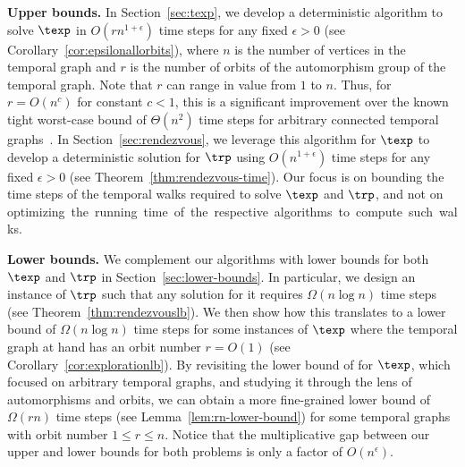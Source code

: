 \begin{sloppypar}
\textbf{Upper bounds.} 
In Section~\ref{sec:texp}, we develop a deterministic algorithm to solve $\texp$
in $O(r n^{1+\epsilon})$ time steps for any fixed $\epsilon >0$ (see
Corollary~\ref{cor:epsilonallorbits}), where $n$ is the number of vertices in
the temporal graph and $r$ is the number of orbits of the automorphism group of
the temporal graph. Note that $r$ can range in value from $1$ to $n$. Thus, for
$r=O(n^c)$ for constant $c<1$, this is a significant improvement over the known
tight worst-case bound of $\Theta(n^2)$ time steps for
arbitrary connected temporal graphs~\cite{ErlebachHK21}. %
In Section~\ref{sec:rendezvous}, {we leverage this algorithm for $\texp$ to
develop a deterministic solution for $\trp$ using} $O(n^{1+\epsilon})$ time
steps for any fixed $\epsilon > 0$ (see Theorem~\ref{thm:rendezvous-time}). 
Our focus is on bounding the time steps of the temporal walks required to
solve $\texp$ and $\trp$, and not on \mbox{optimizing the running time of the
respective algorithms to compute such walks.}
\end{sloppypar}

\textbf{Lower bounds.} 
We complement our algorithms with lower bounds for both $\texp$ and $\trp$ in
Section~\ref{sec:lower-bounds}. In particular, we design an instance of $\trp$
such that any solution for it requires $\Omega(n \log n)$ time steps (see
Theorem~\ref{thm:rendezvouslb}). We then show how this translates to a lower
bound of $\Omega(n \log n)$ time steps for {some instances of $\texp$ where
the temporal graph at hand has an orbit number $r=O(1)$ (see
Corollary~\ref{cor:explorationlb})}. By revisiting the lower bound of
\cite{ErlebachHK21} for $\texp$, which focused on arbitrary temporal graphs, and
studying it through the lens of automorphisms and orbits, we can obtain a more
fine-grained lower bound of $\Omega(rn)$ time steps (see
Lemma~\ref{lem:rn-lower-bound}) for {some temporal graphs with orbit number
$1\le r \le n$.} Notice that the {multiplicative} gap between our upper and lower bounds for both
problems is only {a factor of} $O(n^\epsilon)$.

